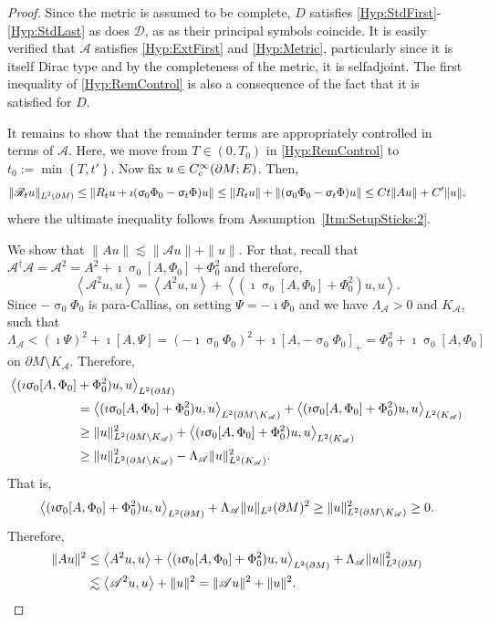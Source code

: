 \documentclass[a4paper,10pt,reqno]{amsart}
\newcommand{\sym}{\upsigma}
\newcommand{\dbrac}[1]{\left\{#1\right\}}
\newcommand{\norm}[1]{\| #1 \|}%
\newcommand{\set}[1]{\dbrac{#1}}
\newcommand{\Lp}[2][{}]{{\rm L}^{#2}_{\rm #1}}%
\newcommand{\Ck}[2][{}]{{\rm C}^{#2}_{\rm #1}}%
\newcommand{\inprod}[1]{\left\langle #1 \right\rangle}%
\newcommand{\DDD}{\mathscr{D}}%
\newcommand{\AAA}{\mathscr{A}}%
\newcommand{\RRR}{\mathscr{R}}%
\newcommand{\dM}{\partial M}
\theoremstyle{definition}
\begin{document}
\begin{proof}
Since the metric is assumed to be complete, $D$ satisfies \ref{Hyp:StdFirst}-\ref{Hyp:StdLast} as does  $\DDD$, as as their principal symbols coincide.
It is easily verified that $\AAA$ satisfies \ref{Hyp:ExtFirst} and \ref{Hyp:Metric}, particularly since it is itself Dirac type and by the completeness of the metric, it is selfadjoint. 
The first inequality of \ref{Hyp:RemControl} is also a consequence of the fact that it is satisfied for $D$. 

It remains to show that the remainder terms are appropriately controlled in terms of $\AAA$.
Here, we move from $T \in (0,T_0)$ in \ref{Hyp:RemControl} to $t_0 := \min\set{T, t'}$.
Now fix $u \in \Ck[c]{\infty}(\dM;E)$.
Then, 
\begin{align*} 
\norm{\RRR_t u}_{\Lp{2}(\dM)} 
\leq 
\norm{R_t u + \imath (\sym_0 \Phi_0 - \sym_t \Phi)u}  
\leq 
\norm{R_t u} + \norm{(\sym_0 \Phi_0 - \sym_t \Phi)u} 
\leq 
C t\norm{A u} + C'\norm{u},
\end{align*}
where the ultimate inequality follows from Assumption~\ref{Itm:SetupSticks:2}.

We show that $\norm{Au} \lesssim \norm{\AAA u} + \norm{u}$.
For that, recall that $\AAA^\dagger\AAA = \AAA^2  = A^2 + \imath \sym_0[A,\Phi_0] + \Phi_0^2$ and therefore, 
$$
\inprod{\AAA^2 u, u} = \inprod{A^2 u, u} + \inprod{(\imath \sym_0[A,\Phi_0] + \Phi_0^2)u, u}.
$$
Since $-\sym_0\Phi_0$ is para-Callias, on setting $\Psi = - \imath \Phi_0$ and we have  $\Lambda_{\AAA} > 0$ and $K_{\AAA}$, such that 
$$
\Lambda_{\AAA}
<
(\imath \Psi)^2 + \imath[A,\Psi] 
= 
(-\imath \sym_0 \Phi_0)^2 + \imath[A, -\sym_0 \Phi_0]_+ 
=
\Phi_0^2 + \imath\sym_0[A,\Phi_0] $$ 
on $\dM \setminus K_{\AAA}$. 
Therefore, 
\begin{align*} 
\big\langle (\imath \sym_0[A,\Phi_0] &+ \Phi_0^2)u, u\big\rangle_{\Lp{2}(\dM)} \\ 
&=  \inprod{(\imath \sym_0[A,\Phi_0] + \Phi_0^2)u, u}_{\Lp{2}(\dM \setminus K_{\AAA})} + \inprod{(\imath \sym_0[A,\Phi_0] + \Phi_0^2)u, u}_{\Lp{2}(K_{\AAA})} \\
&\geq
\norm{u}^2_{\Lp{2}(\dM \setminus K_{\AAA})} +  \inprod{(\imath \sym_0[A,\Phi_0] + \Phi_0^2)u, u}_{\Lp{2}(K_{\AAA})} \\ 
&\geq 
\norm{u}^2_{\Lp{2}(\dM \setminus K_{\AAA})} - \Lambda_{\AAA} \norm{u}^2_{\Lp{2}(K_{\AAA})}. 
\end{align*}
That is,
$$\inprod{(\imath \sym_0[A,\Phi_0] + \Phi_0^2)u, u}_{\Lp{2}(\dM)} + \Lambda_{\AAA} \norm{u}_{\Lp{2}}(\dM)^2 \geq \norm{u}^2_{\Lp{2}(\dM \setminus K_{\AAA})} \geq 0.$$
Therefore, 
\begin{equation}
\label{Eq:Rem}
\begin{aligned}
\norm{Au}^2 
&\leq  \inprod{A^2 u, u} + \inprod{(\imath \sym_0[A,\Phi_0] + \Phi_0^2)u, u}_{\Lp{2}(\dM)} + \Lambda_{\AAA} \norm{u}_{\Lp{2}(\dM)}^2  \\ 
&\lesssim  \inprod{\AAA^2u,u}  + \norm{u}^2 
= \norm{\AAA u}^2  + \norm{u}^2.
\end{aligned}
\end{equation}


\end{proof}
\end{document}
